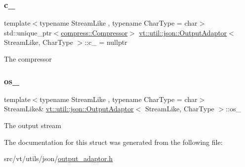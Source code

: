 \subsubsection{\texorpdfstring{c\+\_\+}{c\_}}
{\footnotesize\ttfamily template$<$typename Stream\+Like , typename Char\+Type  = char$>$ \\
std\+::unique\+\_\+ptr$<$\hyperlink{structvt_1_1util_1_1compress_1_1_compressor}{compress\+::\+Compressor}$>$ \hyperlink{structvt_1_1util_1_1json_1_1_output_adaptor}{vt\+::util\+::json\+::\+Output\+Adaptor}$<$ Stream\+Like, Char\+Type $>$\+::c\+\_\+ = nullptr\hspace{0.3cm}{\ttfamily [private]}}

The compressor \mbox{\label{structvt_1_1util_1_1json_1_1_output_adaptor_aef3a9e890ea22507fe71186a33dd8aff}} 
\subsubsection{\texorpdfstring{os\+\_\+}{os\_}}
{\footnotesize\ttfamily template$<$typename Stream\+Like , typename Char\+Type  = char$>$ \\
Stream\+Like\& \hyperlink{structvt_1_1util_1_1json_1_1_output_adaptor}{vt\+::util\+::json\+::\+Output\+Adaptor}$<$ Stream\+Like, Char\+Type $>$\+::os\+\_\+\hspace{0.3cm}{\ttfamily [private]}}

The output stream 

The documentation for this struct was generated from the following file\+:\begin{DoxyCompactItemize}
\item 
src/vt/utils/json/\hyperlink{output__adaptor_8h}{output\+\_\+adaptor.\+h}\end{DoxyCompactItemize}
